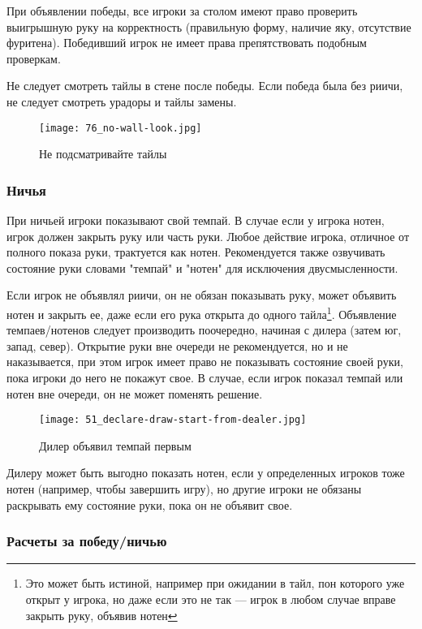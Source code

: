 При объявлении победы, все игроки за столом имеют право проверить выигрышную руку на корректность (правильную форму, наличие яку, отсутствие фуритена). Победивший игрок не имеет права препятствовать подобным проверкам.

Не следует смотреть тайлы в стене после победы. Если победа была без риичи, не следует смотреть урадоры и тайлы замены. 

\begin{figure}[H]
	\centering
	\texttt{[image: 76\_no-wall-look.jpg]}
	\caption{Не подсматривайте тайлы}
\end{figure}

\newpage

\subsubsection{Ничья}

При ничьей игроки показывают свой темпай. В случае если у игрока нотен, игрок должен закрыть руку или часть руки. Любое действие игрока, отличное от полного показа руки, трактуется как нотен. Рекомендуется также озвучивать состояние руки словами "темпай" и "нотен" для исключения двусмысленности.

Если игрок не объявлял риичи, он не обязан показывать руку, может объявить нотен и закрыть ее, даже если его рука открыта до одного тайла\footnote{Это может быть истиной, например при ожидании в тайл, пон которого уже открыт у игрока, но даже если это не так --- игрок в любом случае вправе закрыть руку, объявив нотен}. Объявление темпаев/нотенов следует производить поочередно, начиная с дилера (затем юг, запад, север). Открытие руки вне очереди не рекомендуется, но и не наказывается, при этом игрок имеет право не показывать состояние своей руки, пока игроки до него не покажут свое. В случае, если игрок показал темпай или нотен вне очереди, он не может поменять решение.

\begin{figure}[H]
	\centering
	\texttt{[image: 51\_declare-draw-start-from-dealer.jpg]}
	\caption{Дилер объявил темпай первым}
\end{figure}

Дилеру может быть выгодно показать нотен, если у определенных игроков тоже нотен (например, чтобы завершить игру), но другие игроки не обязаны раскрывать ему состояние руки, пока он не объявит свое.

\subsubsection{Расчеты за победу/ничью}

